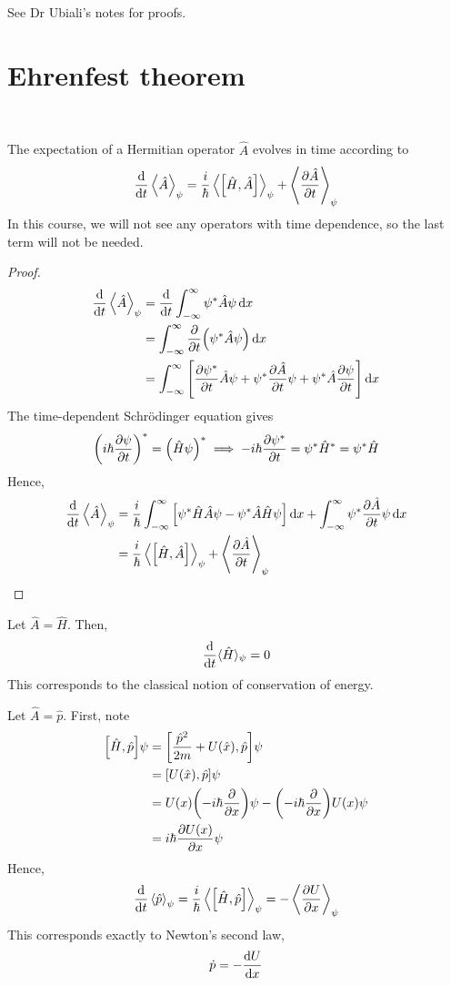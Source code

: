 \documentclass[a4paper,11pt]{article}
\begin{document}
See Dr Ubiali's notes for proofs.

\section{Ehrenfest theorem}\ \vspace{-1.5em}
\begin{theorem}
	The expectation of a Hermitian operator $ \hat{A} $ evolves in time according to
	\[
		\dv{t} \left\langle{\hat A}\right\rangle_\psi = \frac{i}{\hbar} \left\langle{\qty[\hat H, \hat A]}\right\rangle_\psi + \left\langle{\pdv{\hat A}{t}}\right\rangle_\psi
	\]
	In this course, we will not see any operators with time dependence, so the last term will not be needed.
\end{theorem}
\begin{proof}
	\begin{align*}
		\dv{t} \left\langle{\hat A}\right\rangle_\psi & = \dv{t} \int_{-\infty}^\infty \psi^* \hat A \psi \dd{x}                                                                              \\
		                           & = \int_{-\infty}^\infty \pdv{t} \qty(\psi^* \hat A \psi) \dd{x}                                                                       \\
		                           & = \int_{-\infty}^\infty \qty[\pdv{\psi^*}{t} \hat A \psi + \psi^* \pdv{\hat A}{t} \psi + \psi^* \hat A \pdv{\psi}{t} ] \dd{x}
	\end{align*}
	The time-dependent Schr\"odinger equation gives
	\[
		\qty(i \hbar \pdv{\psi}{t})^* = \qty(\hat H \psi)^* \implies -i\hbar \pdv{\psi^*}{t} = \psi^* \hat H^* = \psi^* \hat H
	\]
	Hence,
	\begin{align*}
		\dv{t} \left\langle{\hat A}\right\rangle_\psi & = \frac{i}{\hbar} \int_{-\infty}^\infty \qty[\psi^* \hat H \hat A \psi - \psi^* \hat A \hat H \psi] \dd{x} + \int_{-\infty}^\infty \psi^* \pdv{\hat A}{t} \psi \dd{x} \\
		                           & = \frac{i}{\hbar} \left\langle{\qty[\hat H, \hat A]}\right\rangle_\psi + \left\langle{\pdv{\hat A}{t}}\right\rangle_\psi \qedhere
	\end{align*}
\end{proof}
\begin{example}
	Let \( \hat A = \hat H \).
	Then,
	\[
		\dv{t} \langle{\hat H}\rangle_\psi = 0
	\]
	This corresponds to the classical notion of conservation of energy.
\end{example}
\begin{example}
	Let \( \hat A = \hat p \).
	First, note
	\begin{align*}
		\qty[\hat H, \hat p] \psi & = \qty[\frac{\hat p^2}{2m} + U(\hat x), \hat p] \psi               \\
		                          & = \qty[U(\hat x), \hat p] \psi                                     \\
		                          & = U(x) \qty(-i\hbar \pdv{x}) \psi - \qty(-i\hbar \pdv{x})U(x) \psi \\
		                          & = i \hbar \pdv{U(x)}{x} \psi
	\end{align*}
	Hence,
	\[
		\dv{t}\left\langle{\hat p}\right\rangle_\psi = \frac{i}{\hbar} \left\langle{\qty[\hat H, \hat p]}\right\rangle_\psi = -\left\langle{\pdv{U}{x}}\right\rangle_\psi
	\]
	This corresponds exactly to Newton's second law,
	\[
		\dot p = -\dv{U}{x}
	\]
\end{example}
\end{document}
